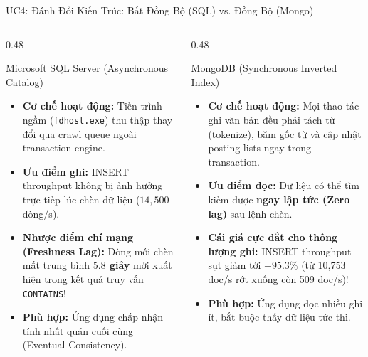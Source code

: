 \documentclass[aspectratio=169,9pt]{beamer}
\begin{document}
\begin{frame}{UC4: Đánh Đổi Kiến Trúc: Bất Đồng Bộ (SQL) vs. Đồng Bộ (Mongo)}
\begin{columns}[T]
\begin{column}{0.48\textwidth}
\begin{block}{Microsoft SQL Server (Asynchronous Catalog)}
\footnotesize
\begin{itemize}
  \item \textbf{Cơ chế hoạt động:} Tiến trình ngầm (\texttt{fdhost.exe}) thu thập thay đổi qua crawl queue ngoài transaction engine.
  \item \textbf{Ưu điểm ghi:} INSERT throughput không bị ảnh hưởng trực tiếp lúc chèn dữ liệu ($14,500$ dòng/s).
  \item \textbf{Nhược điểm chí mạng (Freshness Lag):} Dòng mới chèn mất trung bình \textbf{$5.8$ giây} mới xuất hiện trong kết quả truy vấn \texttt{CONTAINS}!
  \item \textbf{Phù hợp:} Ứng dụng chấp nhận tính nhất quán cuối cùng (Eventual Consistency).
\end{itemize}
\end{block}
\end{column}

\begin{column}{0.48\textwidth}
\begin{alertblock}{MongoDB (Synchronous Inverted Index)}
\footnotesize
\begin{itemize}
  \item \textbf{Cơ chế hoạt động:} Mọi thao tác ghi văn bản đều phải tách từ (tokenize), băm gốc từ và cập nhật posting lists ngay trong transaction.
  \item \textbf{Ưu điểm đọc:} Dữ liệu có thể tìm kiếm được \textbf{ngay lập tức (Zero lag)} sau lệnh chèn.
  \item \textbf{Cái giá cực đắt cho thông lượng ghi:} INSERT throughput sụt giảm tới \textbf{$-95.3\%$} (từ 10,753 doc/s rớt xuống còn 509 doc/s)!
  \item \textbf{Phù hợp:} Ứng dụng đọc nhiều ghi ít, bắt buộc thấy dữ liệu tức thì.
\end{itemize}
\end{alertblock}
\end{column}
\end{columns}
\end{frame}
\end{document}
